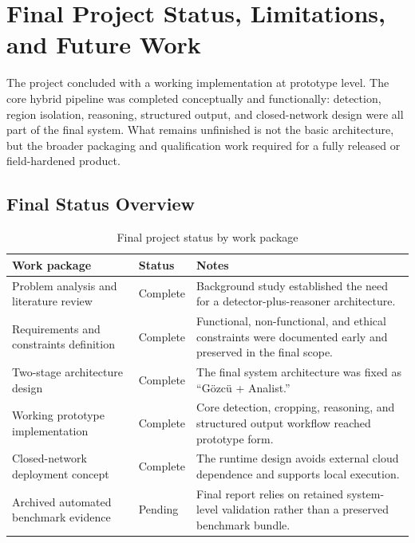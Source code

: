 \section{Final Project Status, Limitations, and Future Work}
\label{sec:status}

The project concluded with a working implementation at prototype level. The core
hybrid pipeline was completed conceptually and functionally: detection, region isolation,
reasoning, structured output, and closed-network design were all part of the final system.
What remains unfinished is not the basic architecture, but the broader packaging and
qualification work required for a fully released or field-hardened product.

\subsection{Final Status Overview}

\begin{table}[H]
  \centering
  \caption{Final project status by work package}
  \begin{tabularx}{\textwidth}{@{}p{5.2cm}p{2.2cm}X@{}}
    \toprule
    Work package & Status & Notes \\
    \midrule
    Problem analysis and literature review & Complete & Background study established the
    need for a detector-plus-reasoner architecture. \\
    Requirements and constraints definition & Complete & Functional, non-functional, and
    ethical constraints were documented early and preserved in the final scope. \\
    Two-stage architecture design & Complete & The final system architecture was fixed as
    ``Gözcü + Analist.'' \\
    Working prototype implementation & Complete & Core detection, cropping, reasoning,
    and structured output workflow reached prototype form. \\
    Closed-network deployment concept & Complete & The runtime design avoids external
    cloud dependence and supports local execution. \\
    Archived automated benchmark evidence & Pending & Final report relies on retained
    system-level validation rather than a preserved benchmark bundle. \\
    \bottomrule
  \end{tabularx}
\end{table}

